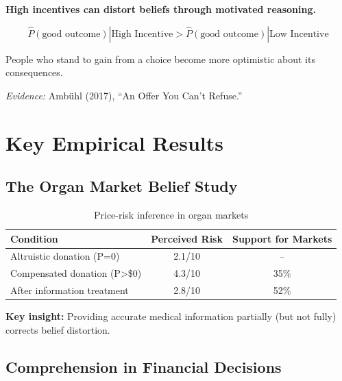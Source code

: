 \begin{tcolorbox}[colback=red!5!white,colframe=red!75!black,title=Axiom SA-6: Incentive-Belief Interaction]
\textbf{High incentives can distort beliefs through motivated reasoning.}

\begin{equation}
\hat{P}(\text{good outcome}) | \text{High Incentive} > \hat{P}(\text{good outcome}) | \text{Low Incentive}
\end{equation}

People who stand to gain from a choice become more optimistic about its consequences.

\textit{Evidence:} Ambühl (2017), ``An Offer You Can't Refuse.''
\end{tcolorbox}

\section{Key Empirical Results}

\subsection{The Organ Market Belief Study}

\begin{table}[h]
\centering
\begin{tabular}{lcc}
\hline
\textbf{Condition} & \textbf{Perceived Risk} & \textbf{Support for Markets} \\
\hline
Altruistic donation (P=0) & 2.1/10 & -- \\
Compensated donation (P>\$0) & 4.3/10 & 35\% \\
After information treatment & 2.8/10 & 52\% \\
\hline
\end{tabular}
\caption{Price-risk inference in organ markets}
\end{table}

\textbf{Key insight:} Providing accurate medical information partially (but not fully) corrects belief distortion.

\subsection{Comprehension in Financial Decisions}


